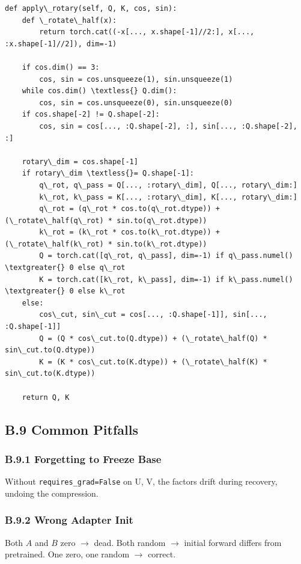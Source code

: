 \begin{lstlisting}
def apply\_rotary(self, Q, K, cos, sin):
    def \_rotate\_half(x):
        return torch.cat((-x[..., x.shape[-1]//2:], x[..., :x.shape[-1]//2]), dim=-1)
    
    if cos.dim() == 3:
        cos, sin = cos.unsqueeze(1), sin.unsqueeze(1)
    while cos.dim() \textless{} Q.dim():
        cos, sin = cos.unsqueeze(0), sin.unsqueeze(0)
    if cos.shape[-2] != Q.shape[-2]:
        cos, sin = cos[..., :Q.shape[-2], :], sin[..., :Q.shape[-2], :]
    
    rotary\_dim = cos.shape[-1]
    if rotary\_dim \textless{}= Q.shape[-1]:
        q\_rot, q\_pass = Q[..., :rotary\_dim], Q[..., rotary\_dim:]
        k\_rot, k\_pass = K[..., :rotary\_dim], K[..., rotary\_dim:]
        q\_rot = (q\_rot * cos.to(q\_rot.dtype)) + (\_rotate\_half(q\_rot) * sin.to(q\_rot.dtype))
        k\_rot = (k\_rot * cos.to(k\_rot.dtype)) + (\_rotate\_half(k\_rot) * sin.to(k\_rot.dtype))
        Q = torch.cat([q\_rot, q\_pass], dim=-1) if q\_pass.numel() \textgreater{} 0 else q\_rot
        K = torch.cat([k\_rot, k\_pass], dim=-1) if k\_pass.numel() \textgreater{} 0 else k\_rot
    else:
        cos\_cut, sin\_cut = cos[..., :Q.shape[-1]], sin[..., :Q.shape[-1]]
        Q = (Q * cos\_cut.to(Q.dtype)) + (\_rotate\_half(Q) * sin\_cut.to(Q.dtype))
        K = (K * cos\_cut.to(K.dtype)) + (\_rotate\_half(K) * sin\_cut.to(K.dtype))
    
    return Q, K
\end{lstlisting}

\subsection{B.9 Common Pitfalls}

\subsubsection{B.9.1 Forgetting to Freeze Base}

Without \texttt{requires\_grad=False} on U, V, the factors drift during recovery, 
undoing the compression.

\subsubsection{B.9.2 Wrong Adapter Init}

Both $A$ and $B$ zero $\to$ dead. Both random $\to$ initial forward differs from 
pretrained. One zero, one random $\to$ correct.

